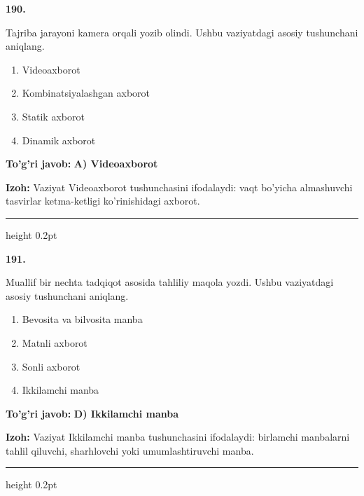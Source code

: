\documentclass[10pt,a4paper,oneside]{article}
\begin{document}
\noindent\textbf{\color{ink}190.}
\par
Tajriba jarayoni kamera orqali yozib olindi. Ushbu vaziyatdagi asosiy tushunchani aniqlang.
\begin{enumerate}[label=\Alph*),leftmargin=9mm]
\item Videoaxborot
\item Kombinatsiyalashgan axborot
\item Statik axborot
\item Dinamik axborot
\end{enumerate}
\begin{tcolorbox}[enhanced,breakable,colback=teal!4,colframe=teal!50!black,boxrule=0.5pt,arc=1.1mm,left=3mm,right=3mm,top=1.7mm,bottom=1.7mm,before skip=2mm,after skip=2mm]
\textbf{\color{teal}To'g'ri javob:} \textbf{A) Videoaxborot}
\par\smallskip
\textbf{Izoh:} Vaziyat Videoaxborot tushunchasini ifodalaydi: vaqt bo'yicha almashuvchi tasvirlar ketma-ketligi ko'rinishidagi axborot.
\end{tcolorbox}
\vspace{2mm}\hrule height 0.2pt \vspace{3mm}

\noindent\textbf{\color{ink}191.}
\par
Muallif bir nechta tadqiqot asosida tahliliy maqola yozdi. Ushbu vaziyatdagi asosiy tushunchani aniqlang.
\begin{enumerate}[label=\Alph*),leftmargin=9mm]
\item Bevosita va bilvosita manba
\item Matnli axborot
\item Sonli axborot
\item Ikkilamchi manba
\end{enumerate}
\begin{tcolorbox}[enhanced,breakable,colback=teal!4,colframe=teal!50!black,boxrule=0.5pt,arc=1.1mm,left=3mm,right=3mm,top=1.7mm,bottom=1.7mm,before skip=2mm,after skip=2mm]
\textbf{\color{teal}To'g'ri javob:} \textbf{D) Ikkilamchi manba}
\par\smallskip
\textbf{Izoh:} Vaziyat Ikkilamchi manba tushunchasini ifodalaydi: birlamchi manbalarni tahlil qiluvchi, sharhlovchi yoki umumlashtiruvchi manba.
\end{tcolorbox}
\vspace{2mm}\hrule height 0.2pt \vspace{3mm}
\end{document}
